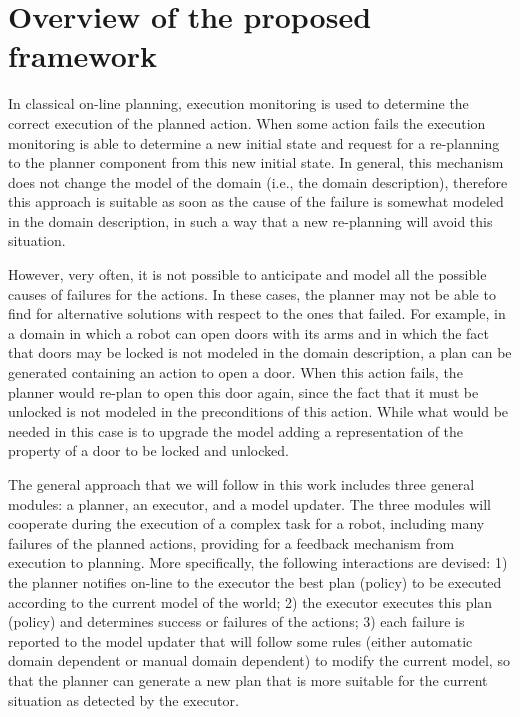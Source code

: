 \section{Overview of the proposed framework}

In classical on-line planning, execution monitoring is used to determine the correct execution of the planned action. When some action fails the execution monitoring is able to determine a new initial state and request for a re-planning to the planner component from this new initial state.
In general, this mechanism does not change the model of the domain (i.e., the domain description), therefore this approach is suitable as soon as the cause of the failure is somewhat modeled in the domain description, in such a way that a new re-planning will avoid this situation.

However, very often, it is not possible to anticipate and model all the possible causes of failures for the actions. In these cases, the planner may not be able to find for alternative solutions with respect to the ones that failed. For example, in a domain in which a robot can open doors with its arms and in which the fact that doors may be locked is not modeled in the domain description, a plan can be generated containing an action to open a door. When this action fails, the planner would re-plan to open this door again, since the fact that it must be unlocked is not modeled in the preconditions of this action.
While what would be needed in this case is to upgrade the model adding a representation of the property of a door to be locked and unlocked.


The general approach that we will follow in this work includes three general modules: a planner, an executor, and a model updater. The three modules will cooperate during the execution of a complex task for a robot, including many failures of the planned actions, providing for a feedback mechanism from execution to planning.
More specifically, the following interactions are devised:
1) the planner notifies on-line to the executor the best plan (policy) to be executed according to the current model of the world; 2) the executor executes this plan (policy) and determines success or failures of the actions; 3) each failure is reported to the model updater that will follow some rules (either automatic domain dependent or manual domain dependent) to modify the current model, so that the planner can generate a new plan that is more suitable for the current situation as detected by the executor.

